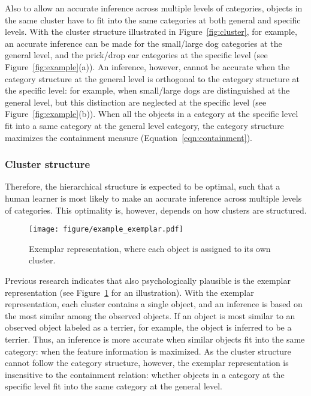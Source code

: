 \documentclass[doc]{apa6}
\begin{document}
Also to allow an accurate inference across multiple levels of categories, objects in the same
cluster have to fit into the same categories at both general and specific levels.  With the cluster
structure illustrated in Figure~\ref{fig:cluster}, for example, an accurate inference can be made
for the small/large dog categories at the general level, and the prick/drop ear categories at the
    specific level (see Figure~\ref{fig:example}(a)). An inference, however, cannot be accurate when
    the category structure at the general level is orthogonal to the category structure at the
    specific level: for example, when small/large dogs are distinguished at the general level, but
    this distinction are neglected at the specific level (see Figure~\ref{fig:example}(b)).  When
    all the objects in a category at the specific level fit into a same category at the general
    level category, the category structure maximizes the containment measure
    (Equation~\ref{eqn:containment}).

\subsubsection*{Cluster structure}

Therefore, the hierarchical structure is expected to be optimal, such that a human learner is most
likely to make an accurate inference across multiple levels of categories.  This optimality is,
however, depends on how clusters are structured.

\begin{figure}
    \centering

    \texttt{[image: figure/example\_exemplar.pdf]}
    \vspace{6pt}

    \caption{Exemplar representation, where each object is assigned to its own cluster.}

\label{fig:exemplar}
\end{figure}

Previous research indicates that also psychologically plausible is the exemplar representation
\parencite{Nosofsky1986a, Nosofsky1991a} (see Figure~\ref{fig:exemplar} for an illustration).  With
the exemplar representation, each cluster contains a single object, and an inference is based on the
most similar among the observed objects.  If an object is most similar to an observed object labeled
as a terrier, for example, the object is inferred to be a terrier.  Thus, an inference is more
accurate when similar objects fit into the same category: when the feature information is maximized.
As the cluster structure cannot follow the category structure, however, the exemplar representation
is insensitive to the containment relation: whether objects in a category at the specific level fit
into the same category at the general level.
\end{document}
